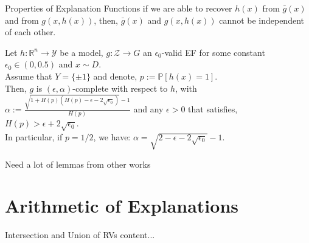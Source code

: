 \documentclass[10pt, aspectratio=169]{beamer}
\begin{document}
	\begin{frame}{Properties of Explanation Functions}
		if we are able to recover $h(x)$ from $\bar{g}(x)$ and from $g(x, h(x))$, then, $\bar{g}(x)$ and $g(x, h(x))$ cannot be independent of each other.
		\begin{theorem}
			Let $h: \mathbb{R}^n \rightarrow \mathcal{Y}$ be a model, $g: \mathcal{Z} \rightarrow G$ an $\epsilon_0$-valid EF for some constant $\epsilon_0 \in(0,0.5)$ and $x \sim D$.\\
			Assume that $Y=\{ \pm 1\}$ and denote, $p:=\mathbb{P}[h(x)=1]$.\\
			Then, $g$ is $(\epsilon, \alpha)$-complete with respect to $h$, with $\alpha:=\frac{\sqrt{1+H(p)\left(H(p)-\epsilon-2 \sqrt{\epsilon_0}\right)}-1}{H(p)}$ and any $\epsilon>0$ that satisfies, $H(p)>\epsilon+2 \sqrt{\epsilon_0}$.\\
			In particular, if $p=1 / 2$, we have: $\alpha=\sqrt{2-\epsilon-2 \sqrt{\epsilon_0}}-1$.
		\end{theorem}
	\end{frame}
	Need a lot of lemmas from other works
	
	\section{Arithmetic of Explanations}

	\begin{frame}{Intersection and Union of RVs}
		content...
	\end{frame}
	
\end{document}
